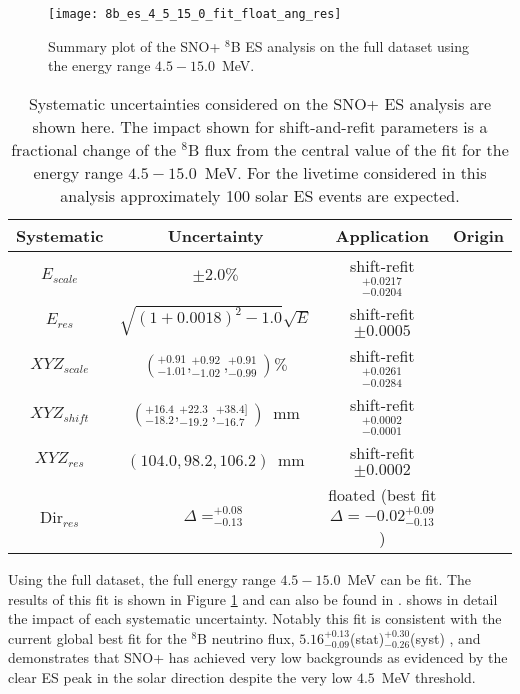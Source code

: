 \begin{figure}
\centering
\texttt{[image: 8b\_es\_4\_5\_15\_0\_fit\_float\_ang\_res]}
\caption{Summary plot of the SNO+ $^8$B ES analysis on the full dataset using the energy range $4.5-15.0$~MeV.}
\label{fig:solar:unpdated_fit_4.5}
\end{figure}

\begin{table}[]
\begin{center}
\begin{tabular}{c|c|c|c}
Systematic & Uncertainty & Application & Origin \\ \hline
$E_{scale}$     & $\pm 2.0\%$ & shift-refit $^{+0.0217}_{-0.0204}$ & \N \rule{0pt}{2.6ex}\rule[-1.2ex]{0pt}{0pt}  \\
$E_{res}$       & $\sqrt{(1+0.0018)^2-1.0}\sqrt{E}$ & shift-refit $\pm 0.0005$ & \N  \rule{0pt}{2.6ex}\rule[-1.2ex]{0pt}{0pt}  \\
${XYZ}_{scale}$ & $(^{+0.91}_{-1.01},^{+0.92}_{-1.02},^{+0.91}_{-0.99}) \%$ & shift-refit $^{+0.0261}_{-0.0284}$ & \N  \rule{0pt}{2.6ex}\rule[-1.2ex]{0pt}{0pt}  \\
${XYZ}_{shift}$ & $(^{+16.4}_{-18.2},^{+22.3}_{-19.2},^{+38.4]}_{-16.7})$~mm & shift-refit $^{+0.0002}_{-0.0001}$ & \N  \rule{0pt}{2.6ex}\rule[-1.2ex]{0pt}{0pt}  \\
${XYZ}_{res}$ & $(104.0,98.2,106.2)$~mm & shift-refit $\pm 0.0002$ & \N \rule{0pt}{2.6ex}\rule[-1.2ex]{0pt}{0pt}  \\
Dir$_{res}$     &  $\Delta = ^{+0.08}_{-0.13}$ & floated (best fit $\Delta = -0.02^{+0.09}_{-0.13}$) & \N \rule{0pt}{2.6ex}\rule[-1.2ex]{0pt}{0pt}  \\ \hline
\end{tabular}
\caption{ Systematic uncertainties considered on the SNO+ ES analysis are shown here.
The impact shown for shift-and-refit parameters is a fractional change of the $^8$B flux from the central value of the fit for the energy range $4.5-15.0$~MeV.
For the livetime considered in this analysis approximately 100 solar ES events are expected.}
\label{tbl:solar:updated_syst}
\end{center}
\end{table}

Using the full dataset, the full energy range $4.5-15.0$~MeV can be fit. 
The results of this fit is shown in Figure \ref{fig:solar:unpdated_fit_4.5} and can also be found in \cite{snoplus_solar}.
 shows in detail the impact of each systematic uncertainty. 
Notably this fit is consistent with the current global best fit for the $^8$B neutrino flux, $5.16^{+0.13}_{-0.09}$(stat)$^{+0.30}_{-0.26}$(syst) \cite{GlobalSolarFlux}, and demonstrates that SNO+ has achieved very low backgrounds as evidenced by the clear ES peak in the solar direction despite the very low $4.5$~MeV threshold.
